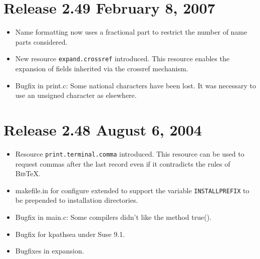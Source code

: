 \documentclass[11pt,a4paper]{scrartcl}
\newcommand\rsc[1]{\texttt{#1}}
\newcommand\File[1]{\textsf{#1}}
\newcommand\BibTeX{\textsc{Bib}\TeX}
\newenvironment{Release}[2]{%
  \def\tmp{#2}%
  \section*{Release #1 \ifx\tmp\empty\else{\normalsize[#2]}\fi}
  \begin{itemize}
}{\end{itemize}}
\newenvironment{Fix}[1]{\item }{}
\newenvironment{New}[1]{\item }{}
\begin{document}
\begin{multicols}
\begin{Release}{2.49}{February 8, 2007}
  \begin{New}{gene}
    Name formatting now uses a fractional part to restrict the number
    of name parts considered.
  \end{New}

  \begin{New}{gene}
    New resource \rsc{expand.crossref} introduced. This resource
    enables the expansion of fields inherited via the crossref
    mechanism.
  \end{New}
  \begin{Fix}{gene}
    Bugfix in \File{print.c}: Some national characters have been lost.
    It was necessary to use an unsigned character as elsewhere.
  \end{Fix}
 \end{Release}

 \begin{Release}{2.48}{August 6, 2004}
  \begin{New}{gene}
    Resource \rsc{print.terminal.comma} introduced. This resource can
    be used to request commas after the last record even if it
    contradicts the rules of \BibTeX.
  \end{New}
  \begin{New}{gene}
    \File{makefile.in} for configure extended to support the variable
    \texttt{INSTALLPREFIX} to be prepended to installation
    directories.
  \end{New}
  \begin{Fix}{gene}
    Bugfix in \File{main.c}: Some compilers didn't like the method
    true().
  \end{Fix}
  \begin{Fix}{gene}
    Bugfix for kpathsea under Suse 9.1.
  \end{Fix}
  \begin{Fix}{gene}
    Bugfixes in expansion.
  \end{Fix}


\end{Release}
\end{multicols}
\end{document}

